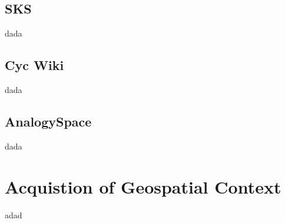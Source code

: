 \subsection {SKS}
dada

\subsection{Cyc Wiki}
dada

\subsection{AnalogySpace}
dada


\section{Acquistion of Geospatial Context}
adad
